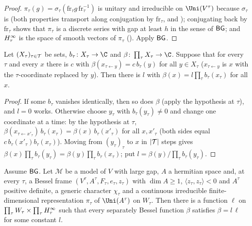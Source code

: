 \begin{proof}
$\pi_\tau(g)=\sigma_\tau(\mathrm{fr}_\tau g\,\mathrm{fr}_\tau^{-1})$ is unitary and irreducible on $\Uni(V^\tau)$ because $\sigma_\tau$ is
(both properties transport along conjugation by $\mathrm{fr}_\tau$,  and
); conjugating back by $\mathrm{fr}_\tau$ shows that $\pi_\tau$ is a discrete series with
gap at least $h$ in the sense of $\mathsf{BG}$; and $H^{\infty}_\tau$ is the space of smooth vectors of $\pi_\tau$
(). Apply $\mathsf{BG}$.
\end{proof}

\begin{lemma}\label{pf:fs:separately}
Let $(X_\tau)_{\tau\in\mathcal T}$ be sets, $b_\tau\colon X_\tau\to\C$ and $\beta\colon\prod_\tau X_\tau\to\C$. Suppose that for every $\tau$
and every $x$ there is $c$ with $\beta(x_{\tau\leftarrow y})=c\,b_\tau(y)$ for all $y\in X_\tau$ ($x_{\tau\leftarrow y}$ is $x$
with the $\tau$-coordinate replaced by $y$). Then there is $l$ with $\beta(x)=l\prod_\tau b_\tau(x_\tau)$ for all $x$.
\end{lemma}

\begin{proof}
If some $b_\tau$ vanishes identically, then so does $\beta$ (apply the hypothesis at $\tau$), and $l=0$ works. Otherwise choose
$y_\tau$ with $b_\tau(y_\tau)\ne0$ and change one coordinate at a time: by the hypothesis at $\tau$,
$\beta(x_{\tau\leftarrow x'_\tau})\,b_\tau(x_\tau)=\beta(x)\,b_\tau(x'_\tau)$ for all $x,x'_\tau$ (both sides equal
$c\,b_\tau(x'_\tau)b_\tau(x_\tau)$). Moving from $(y_\tau)_\tau$ to $x$ in $|\mathcal T|$ steps gives
$\beta(x)\prod_\tau b_\tau(y_\tau)=\beta(y)\prod_\tau b_\tau(x_\tau)$; put $l=\beta(y)/\prod_\tau b_\tau(y_\tau)$.
\end{proof}

\begin{lemma}\label{pf:fs:sepLine}
Assume $\mathsf{BG}$. Let $\mathcal M$ be a model of $V$ with large gap, $A$ a hermitian space and, at every $\tau$, a Bessel frame
$(V^\tau,A^\tau,F_\tau,e_\tau,z_\tau)$ with $\dim A\ge1$, $\langle z_\tau,z_\tau\rangle<0$ and $A^\tau$ positive definite, a
generic character $\chi_\tau$ and a continuous irreducible finite-dimensional representation $\pi_\tau$ of $\Uni(A^\tau)$ on
$W_\tau$. Then there is a function $\ell$ on $\prod_\tau W_\tau\times\prod_\tau H^{\infty}_\tau$ such that every separately Bessel function
$\beta$ satisfies $\beta=l\,\ell$ for some constant $l$.
\end{lemma}


